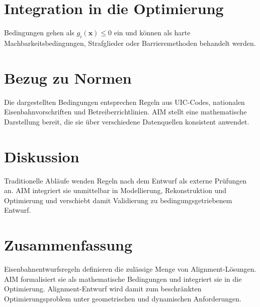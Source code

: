 \section{Integration in die Optimierung}
Bedingungen gehen als \(g_i(\mathbf x)\leq0\) ein und können als harte
Machbarkeitsbedingungen, Strafglieder oder Barrieremethoden behandelt werden.

\section{Bezug zu Normen}
Die dargestellten Bedingungen entsprechen Regeln aus UIC-Codes, nationalen
Eisenbahnvorschriften und Betreiberrichtlinien. AIM stellt eine mathematische
Darstellung bereit, die sie über verschiedene Datenquellen konsistent anwendet.

\section{Diskussion}
Traditionelle Abläufe wenden Regeln nach dem Entwurf als externe Prüfungen an.
AIM integriert sie unmittelbar in Modellierung, Rekonstruktion und Optimierung
und verschiebt damit Validierung zu bedingungsgetriebenem Entwurf.

\section{Zusammenfassung}
\begin{summary}
Eisenbahnentwurfsregeln definieren die zulässige Menge von
Alignment-Lösungen. AIM formalisiert sie als mathematische Bedingungen und
integriert sie in die Optimierung. Alignment-Entwurf wird damit zum
beschränkten Optimierungsproblem unter geometrischen und dynamischen
Anforderungen.
\end{summary}

